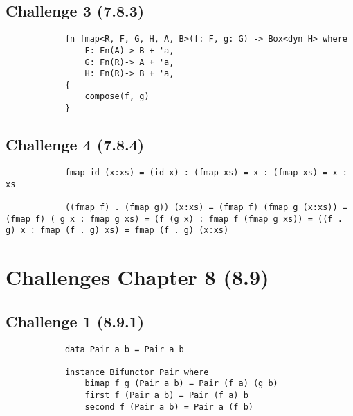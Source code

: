\documentclass[11pt]{article}
\begin{document}
    \subsection*{Challenge 3 (7.8.3)}
        \begin{verbatim}
            fn fmap<R, F, G, H, A, B>(f: F, g: G) -> Box<dyn H> where
                F: Fn(A)-> B + 'a,
                G: Fn(R)-> A + 'a,
                H: Fn(R)-> B + 'a,
            {
                compose(f, g)
            }
        \end{verbatim}

    \subsection*{Challenge 4 (7.8.4)}
        \begin{verbatim}
            fmap id (x:xs) = (id x) : (fmap xs) = x : (fmap xs) = x : xs

            ((fmap f) . (fmap g)) (x:xs) = (fmap f) (fmap g (x:xs)) = (fmap f) ( g x : fmap g xs) = (f (g x) : fmap f (fmap g xs)) = ((f . g) x : fmap (f . g) xs) = fmap (f . g) (x:xs)
        \end{verbatim}



\section*{Challenges Chapter 8 (8.9)}

    \subsection*{Challenge 1 (8.9.1)}

        \begin{verbatim}
            data Pair a b = Pair a b

            instance Bifunctor Pair where
                bimap f g (Pair a b) = Pair (f a) (g b)
                first f (Pair a b) = Pair (f a) b
                second f (Pair a b) = Pair a (f b)
        \end{verbatim}
\end{document}
